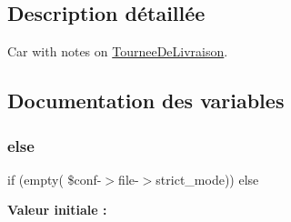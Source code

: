 \subsection{Description détaillée}
Car with notes on \hyperlink{classTourneeDeLivraison}{Tournee\+De\+Livraison}. 



\subsection{Documentation des variables}
\mbox{\label{tourneedelivraison__note_8php_aff326962ca0f1945836a0c4ca5f0be08}} 
\subsubsection{\texorpdfstring{else}{else}}
{\footnotesize\ttfamily if (empty( \$conf-\/$>$file-\/$>$strict\+\_\+mode)) else}

{\bfseries Valeur initiale \+:}
